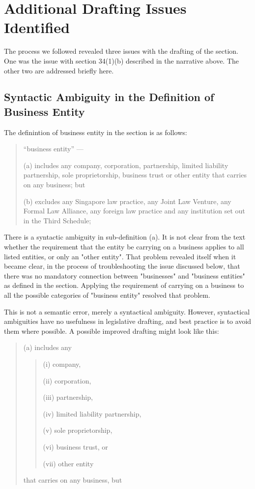 \documentclass[sigconf]{acmart}
\begin{document}
\section{Additional Drafting Issues Identified}
The process we followed revealed three issues with the drafting of the section. One was
the issue with section 34(1)(b) described in the narrative above. The other two
are addressed briefly here.

\subsection{Syntactic Ambiguity in the Definition of Business Entity}
The definintion of business entity in the section is as follows:

\begin{quote}
    “business entity”  —
    
    (a)	includes any company, corporation, partnership, limited liability partnership, sole proprietorship, business trust or other entity that carries on any business; but
    
    (b) excludes any Singapore law practice, any Joint Law Venture, any Formal Law Alliance, any foreign law practice and any institution set out in the Third Schedule;
\end{quote}

There is a syntactic ambiguity in sub-definition (a). It is not clear from the text whether the requirement
that the entity be carrying on a business applies to all listed entities, or only an "other entity".
That problem revealed itself when it became clear, in the process of troubleshooting
the issue discussed below, that there was no mandatory connection between "businesses" and
"business entities" as defined in the section. Applying the requirement of
carrying on a business to all the possible categories of "business entity" resolved that problem.

This is not a semantic error, merely a syntactical ambiguity. However, syntactical
ambiguities have no usefulness in legislative drafting, and best practice is to
avoid them where possible. A possible improved drafting might look like this:

\begin{quote}
    (a) includes any
    \begin{quote}
    
        (i) company,
        
        (ii) corporation,
        
        (iii) partnership,
        
        (iv) limited liability partnership,
        
        (v) sole proprietorship,
        
        (vi) business trust, or
        
        (vii) other entity
    \end{quote}
        
        that carries on any business, but
\end{quote}
\end{document}
